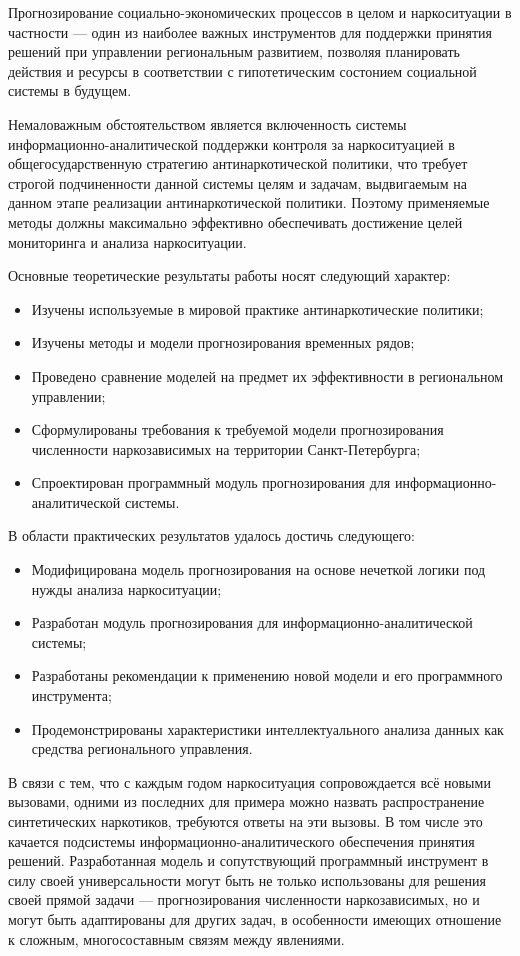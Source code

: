 Прогнозирование социально-экономических процессов в целом и наркоситуации в
частности --- один из наиболее важных инструментов для поддержки принятия
решений при управлении региональным развитием, позволяя планировать действия и
ресурсы  в соответствии с гипотетическим состонием социальной системы в будущем.

Немаловажным обстоятельством является включенность системы
информационно-аналитической поддержки контроля за наркоситуацией в
общегосударственную стратегию антинаркотической политики, что требует строгой
подчиненности данной системы целям и задачам, выдвигаемым на данном этапе
реализации антинаркотической политики. Поэтому применяемые методы должны
максимально эффективно обеспечивать достижение целей мониторинга и анализа
наркоситуации.

Основные теоретические результаты работы носят следующий характер: 
\begin{itemize}
\item Изучены используемые в мировой практике антинаркотические политики;
\item Изучены методы и модели прогнозирования временных рядов;
\item Проведено сравнение моделей на предмет их эффективности в региональном
управлении;
\item Сформулированы требования к требуемой модели прогнозирования численности
наркозависимых на территории Санкт-Петербурга;
\item Спроектирован программный модуль прогнозирования для
информационно-аналитической системы.
\end{itemize}

В области практических результатов удалось достичь следующего:
\begin{itemize}
\item Модифицирована модель прогнозирования на основе нечеткой логики под нужды
анализа наркоситуации;
\item Разработан модуль прогнозирования для информационно-аналитической системы;
\item Разработаны рекомендации к применению новой модели и 
его программного инструмента;
\item Продемонстрированы характеристики интеллектуального анализа данных как
средства регионального управления.
\end{itemize}

В связи с тем, что с каждым годом наркоситуация сопровождается всё новыми
вызовами, одними из последних для примера можно назвать распространение
синтетических наркотиков, требуются ответы на эти вызовы. В том числе это
качается подсистемы информационно-аналитического обеспечения принятия решений.
Разработанная модель и сопутствующий  программный инструмент в силу своей
универсальности могут быть не только использованы для решения своей прямой
задачи --- прогнозирования численности наркозависимых, но и могут быть
адаптированы для других задач, в особенности имеющих отношение к сложным,
многосоставным связям между явлениями.

